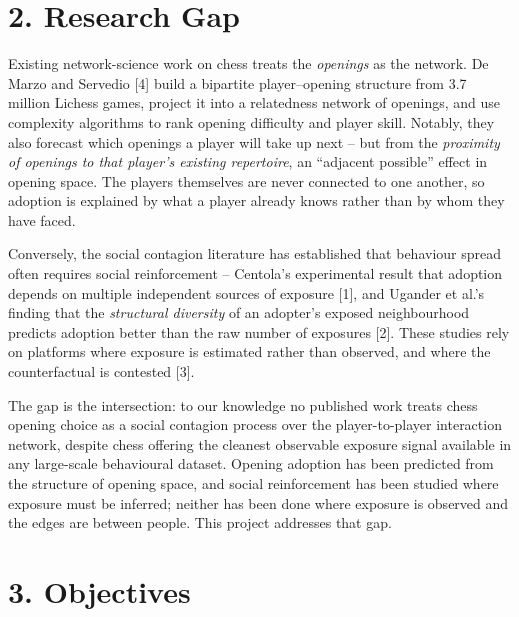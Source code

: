 \documentclass[11pt,a4paper]{article}
\begin{document}
\section*{2. Research Gap}

Existing network-science work on chess treats the \textit{openings} as the
network. De Marzo and Servedio [4] build a bipartite player--opening structure
from 3.7 million Lichess games, project it into a relatedness network of
openings, and use complexity algorithms to rank opening difficulty and player
skill. Notably, they also forecast which openings a player will take up next --
but from the \textit{proximity of openings to that player's existing
repertoire}, an ``adjacent possible'' effect in opening space. The players
themselves are never connected to one another, so adoption is explained by
what a player already knows rather than by whom they have faced.

Conversely, the social contagion literature has established that behaviour
spread often requires social reinforcement -- Centola's experimental result that
adoption depends on multiple independent sources of exposure [1], and Ugander et
al.'s finding that the \textit{structural diversity} of an adopter's exposed
neighbourhood predicts adoption better than the raw number of exposures [2].
These studies rely on platforms where exposure is estimated rather than
observed, and where the counterfactual is contested [3].

The gap is the intersection: to our knowledge no published work treats chess
opening choice as a social contagion process over the player-to-player
interaction network, despite chess offering the cleanest observable exposure
signal available in any large-scale behavioural dataset. Opening adoption has
been predicted from the structure of opening space, and social reinforcement
has been studied where exposure must be inferred; neither has been done where
exposure is observed and the edges are between people. This project addresses
that gap.

\section*{3. Objectives}
\end{document}
